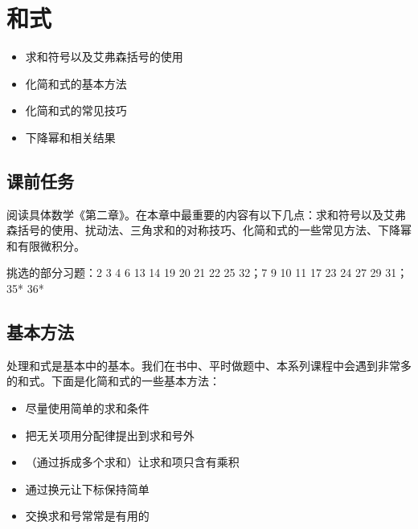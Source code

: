 \chapter{和式}
\begin{overview}
\begin{itemize}
    \item 求和符号以及艾弗森括号的使用
    \item 化简和式的基本方法
    \item 化简和式的常见技巧
    \item 下降幂和相关结果
    \end{itemize}
\end{overview}
\section{课前任务}
    阅读具体数学《第二章》。在本章中最重要的内容有以下几点：求和符号以及艾弗森括号的使用、扰动法、三角求和的对称技巧、化简和式的一些常见方法、下降幂和有限微积分。

    挑选的部分习题：2 3 4 6 13 14 19 20 21 22 25 32；7 9 10 11 17 23 24 27 29 31；35* 36*
\section{基本方法}
处理和式是基本中的基本。我们在书中、平时做题中、本系列课程中会遇到非常多的和式。下面是化简和式的一些基本方法：
    \begin{itemize}
        \item 尽量使用简单的求和条件
        \item 把无关项用分配律提出到求和号外
        \item （通过拆成多个求和）让求和项只含有乘积
        \item 通过换元让下标保持简单
        \item 交换求和号常常是有用的
    \end{itemize}


